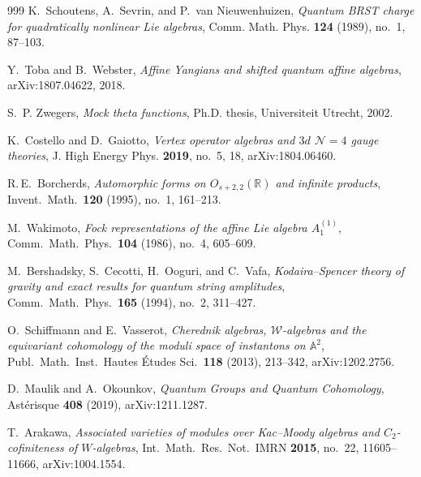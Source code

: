 \documentclass[11pt]{memoir}
\begin{document}
\begin{thebibliography}{999}
K.~Schoutens, A.~Sevrin, and P.~van Nieuwenhuizen, \emph{Quantum BRST charge for quadratically nonlinear Lie algebras}, Comm. Math. Phys. \textbf{124} (1989), no.~1, 87--103.

Y.~Toba and B.~Webster, \emph{Affine Yangians and shifted quantum affine algebras}, arXiv:1807.04622, 2018.

S.~P. Zwegers, \emph{Mock theta functions}, Ph.D. thesis, Universiteit Utrecht, 2002.

K.~Costello and D.~Gaiotto, \emph{Vertex operator algebras and $3d$ $\mathcal N=4$ gauge theories}, J. High Energy Phys. \textbf{2019}, no.~5, 18, arXiv:1804.06460.


R.\,E.~Borcherds, \emph{Automorphic forms on $O_{s+2,2}(\mathbb{R})$ and infinite products}, Invent.\ Math.\ \textbf{120} (1995), no.~1, 161--213.

M.~Wakimoto, \emph{Fock representations of the affine Lie algebra $A_1^{(1)}$}, Comm.\ Math.\ Phys.\ \textbf{104} (1986), no.~4, 605--609.

M.~Bershadsky, S.~Cecotti, H.~Ooguri, and C.~Vafa, \emph{Kodaira--Spencer theory of gravity and exact results for quantum string amplitudes}, Comm.\ Math.\ Phys.\ \textbf{165} (1994), no.~2, 311--427.

O.~Schiffmann and E.~Vasserot, \emph{Cherednik algebras, $\mathcal{W}$-algebras and the equivariant cohomology of the moduli space of instantons on $\mathbb{A}^2$}, Publ.\ Math.\ Inst.\ Hautes \'Etudes Sci.\ \textbf{118} (2013), 213--342, arXiv:1202.2756.

D.~Maulik and A.~Okounkov, \emph{Quantum Groups and Quantum Cohomology}, Ast\'erisque \textbf{408} (2019), arXiv:1211.1287.

T.~Arakawa, \emph{Associated varieties of modules over Kac--Moody algebras and $C_2$-cofiniteness of $W$-algebras}, Int.\ Math.\ Res.\ Not.\ IMRN \textbf{2015}, no.~22, 11605--11666, arXiv:1004.1554.


\end{thebibliography}
\end{document}
